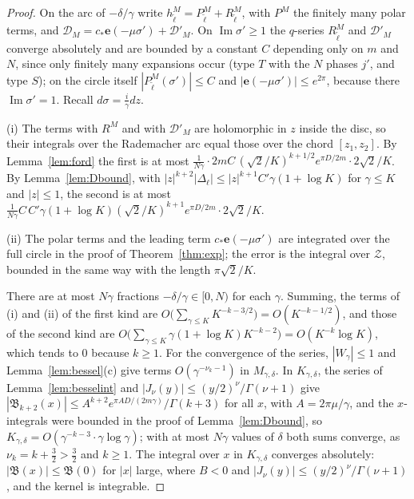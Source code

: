 \documentclass[11pt]{amsart}
\numberwithin{equation}{section}
\theoremstyle{plain}
\theoremstyle{definition}
\theoremstyle{remark}
\newcommand{\e}{\mathbf{e}}
\begin{document}
\begin{proof}
On the arc of $-\delta/\gamma$ write $h^M_{\tilde\ell}=P^M_{\tilde\ell}+R^M_{\tilde\ell}$, with $P^M$ the finitely many polar terms, and $\mathcal D_M=c_*\e(-\mu\sigma')+\mathcal D'_M$. On $\operatorname{Im}\sigma'\ge1$ the $q$-series $R^M_{\tilde\ell}$ and $\mathcal D'_M$ converge absolutely and are bounded by a constant $C$ depending only on $m$ and $N$, since only finitely many expansions occur (type $T$ with the $N$ phases $j'$, and type $S$); on the circle itself $|P^M_{\tilde\ell}(\sigma')|\le C$ and $|\e(-\mu\sigma')|\le e^{2\pi}$, because there $\operatorname{Im}\sigma'=1$. Recall $d\sigma=\frac i\gamma dz$.

(i) The terms with $R^M$ and with $\mathcal D'_M$ are holomorphic in $z$ inside the disc, so their integrals over the Rademacher arc equal those over the chord $[z_1,z_2]$. By Lemma~\ref{lem:ford} the first is at most $\frac1{N\gamma}\cdot2mC\,(\sqrt2/K)^{k+1/2}e^{\pi D/2m}\cdot2\sqrt2/K$. By Lemma~\ref{lem:Dbound}, with $|z|^{k+2}|\Delta_\ell|\le|z|^{k+1}C'\gamma(1+\log K)$ for $\gamma\le K$ and $|z|\le1$, the second is at most $\frac1{N\gamma}C\,C'\gamma(1+\log K)(\sqrt2/K)^{k+1}e^{\pi D/2m}\cdot2\sqrt2/K$.

(ii) The polar terms and the leading term $c_*\e(-\mu\sigma')$ are integrated over the full circle in the proof of Theorem~\ref{thm:exp}; the error is the integral over $\mathcal Z$, bounded in the same way with the length $\pi\sqrt2/K$.

There are at most $N\gamma$ fractions $-\delta/\gamma\in[0,N)$ for each $\gamma$. Summing, the terms of (i) and (ii) of the first kind are $O\bigl(\sum_{\gamma\le K}K^{-k-3/2}\bigr)=O(K^{-k-1/2})$, and those of the second kind are $O\bigl(\sum_{\gamma\le K}\gamma(1+\log K)K^{-k-2}\bigr)=O(K^{-k}\log K)$, which tends to $0$ because $k\ge1$. For the convergence of the series, $|W_\gamma|\le1$ and Lemma~\ref{lem:bessel}(c) give terms $O(\gamma^{-\nu_k-1})$ in $M_{\gamma,\delta}$. In $K_{\gamma,\delta}$, the series of Lemma~\ref{lem:besselint} and $|J_\nu(y)|\le(y/2)^\nu/\Gamma(\nu+1)$ give $|\mathfrak B_{k+2}(x)|\le A^{k+2}e^{\pi AD/(2m\gamma)}/\Gamma(k+3)$ for all $x$, with $A=2\pi\mu/\gamma$, and the $x$-integrals were bounded in the proof of Lemma~\ref{lem:Dbound}, so $K_{\gamma,\delta}=O(\gamma^{-k-3}\cdot\gamma\log\gamma)$; with at most $N\gamma$ values of $\delta$ both sums converge, as $\nu_k=k+\frac32>\frac32$ and $k\ge1$. The integral over $x$ in $K_{\gamma,\delta}$ converges absolutely: $|\mathfrak B(x)|\le\mathfrak B(0)$ for $|x|$ large, where $B<0$ and $|J_\nu(y)|\le(y/2)^\nu/\Gamma(\nu+1)$, and the kernel is integrable.
\end{proof}
\end{document}
